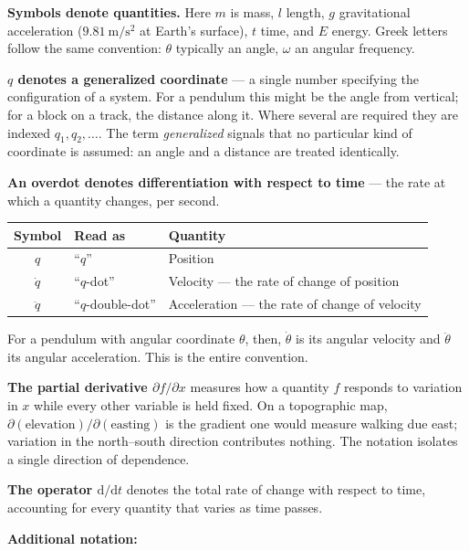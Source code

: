 \documentclass[11pt,a4paper]{article}
\newcommand{\ud}{\mathrm{d}}
\begin{document}
\textbf{Symbols denote quantities.} Here $m$ is mass, $l$ length, $g$ gravitational acceleration
($9.81\ \mathrm{m/s^2}$ at Earth's surface), $t$ time, and $E$ energy. Greek letters follow the same
convention: $\theta$ typically an angle, $\omega$ an angular frequency.

\medskip
\noindent\textbf{$q$ denotes a generalized coordinate} --- a single number specifying the
configuration of a system. For a pendulum this might be the angle from vertical; for a block on a
track, the distance along it. Where several are required they are indexed $q_1, q_2, \dots$. The
term \emph{generalized} signals that no particular kind of coordinate is assumed: an angle and a
distance are treated identically.

\medskip
\noindent\textbf{An overdot denotes differentiation with respect to time} --- the rate at which a
quantity changes, per second.

\begin{center}
\begin{tabular}{@{}clL{7.6cm}@{}}
\toprule
\textbf{Symbol} & \textbf{Read as} & \textbf{Quantity} \\
\midrule
$q$        & ``$q$''              & Position \\
$\dot{q}$  & ``$q$-dot''          & Velocity --- the rate of change of position \\
$\ddot{q}$ & ``$q$-double-dot''   & Acceleration --- the rate of change of velocity \\
\bottomrule
\end{tabular}
\end{center}

\noindent For a pendulum with angular coordinate $\theta$, then, $\dot\theta$ is its angular
velocity and $\ddot\theta$ its angular acceleration. This is the entire convention.

\medskip
\noindent\textbf{The partial derivative $\partial f/\partial x$} measures how a quantity $f$
responds to variation in $x$ while every other variable is held fixed. On a topographic map,
$\partial(\text{elevation})/\partial(\text{easting})$ is the gradient one would measure walking due
east; variation in the north--south direction contributes nothing. The notation isolates a single
direction of dependence.

\medskip
\noindent\textbf{The operator $\ud/\ud t$} denotes the total rate of change with respect to time,
accounting for every quantity that varies as time passes.

\medskip
\noindent\textbf{Additional notation:}
\end{document}
